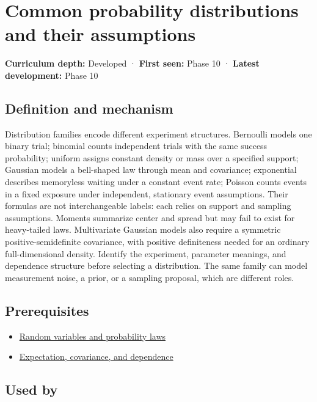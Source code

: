 \hypertarget{appendix-a2360b435383}{}\label{referencestart:appendix-a2360b435383}
\section{Common probability distributions and their assumptions}\label{appendix-a2360b435383-common-probability-distributions-and-their-assumptions}

\textbf{Curriculum depth:} Developed · \textbf{First seen:} Phase 10 · \textbf{Latest development:} Phase 10

\subsection{Definition and mechanism}\label{appendix-a2360b435383-definition-and-mechanism}

Distribution families encode different experiment structures. Bernoulli models one binary trial; binomial counts independent trials with the same success probability; uniform assigns constant density or mass over a specified support; Gaussian models a bell-shaped law through mean and covariance; exponential describes memoryless waiting under a constant event rate; Poisson counts events in a fixed exposure under independent, stationary event assumptions. Their formulas are not interchangeable labels: each relies on support and sampling assumptions. Moments summarize center and spread but may fail to exist for heavy-tailed laws. Multivariate Gaussian models also require a symmetric positive-semidefinite covariance, with positive definiteness needed for an ordinary full-dimensional density. Identify the experiment, parameter meanings, and dependence structure before selecting a distribution. The same family can model measurement noise, a prior, or a sampling proposal, which are different roles.

\subsection{Prerequisites}\label{appendix-a2360b435383-prerequisites}

\begin{itemize}
\tightlist
\item
  \hyperref[appendix-4d0203f7944f]{Random variables and probability laws}
\item
  \hyperref[appendix-54c383df9992]{Expectation, covariance, and dependence}
\end{itemize}

\subsection{Used by}\label{appendix-a2360b435383-used-by}

